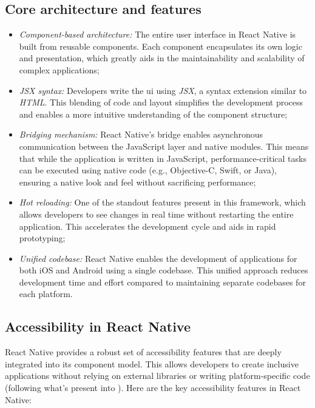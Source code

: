 \subsection{Core architecture and features}
\begin{itemize}
    \item \textit{Component-based architecture:}  
    The entire user interface in React Native is built from reusable components. Each component encapsulates its own logic and presentation, which greatly aids in the maintainability and scalability of complex applications;
    
    \item \textit{JSX syntax:}  
    Developers write the \acrshort{ui} using \textit{JSX}, a syntax extension similar to \textit{HTML}. This blending of code and layout simplifies the development process and enables a more intuitive understanding of the component structure;
    
    \item \textit{Bridging mechanism:}  
    React Native’s bridge enables asynchronous communication between the JavaScript layer and native modules. This means that while the application is written in JavaScript, performance-critical tasks can be executed using native code (e.g., Objective-C, Swift, or Java), ensuring a native look and feel without sacrificing performance;
    
    \item \textit{Hot reloading:}  
    One of the standout features present in this framework, which allows developers to see changes in real time without restarting the entire application. This accelerates the development cycle and aids in rapid prototyping;
    
    \item \textit{Unified codebase:}  
    React Native enables the development of applications for both iOS and Android using a single codebase. This unified approach reduces development time and effort compared to maintaining separate codebases for each platform.
\end{itemize}

\subsection{Accessibility in React Native}
React Native provides a robust set of accessibility features that are deeply integrated into its component model. This allows developers to create inclusive applications without relying on external libraries or writing platform-specific code (following what's present into \cite{site:reactnativeaccess}). Here are the key accessibility features in React Native:

